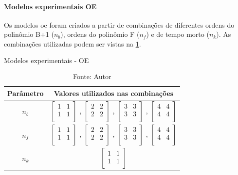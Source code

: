 \paragraph*{\textbf{Modelos experimentais OE}}
\label{par:modelos_experimentais_oe}

Os modelos \acrshort{oe} foram criados a partir de combinações de diferentes ordens do polinômio B+1 ($n_b$),
ordens do polinômio F ($n_f$) e de tempo morto ($n_k$). As combinações utilizadas podem ser vistas na
\cref{tab:tclabsp-models-oe}.

\begin{table}[h]
	\centering
	\caption{Modelos experimentais - OE}
	\label{tab:tclabsp-models-oe}
	\begin{tabular}{c|c} \toprule
		{Parâmetro}		&	{Valores utilizados nas combinações}									\\ \midrule
		$n_b$			&
							$ \begin{bmatrix}	1	&	1	\\	1	&	1	\\	\end{bmatrix} $	,		
							$ \begin{bmatrix}	2	&	2	\\	2	&	2	\\	\end{bmatrix} $	,		
							$ \begin{bmatrix}	3	&	3	\\	3	&	3	\\	\end{bmatrix} $	,		
							$ \begin{bmatrix}	4	&	4	\\	4	&	4	\\	\end{bmatrix} $		\\ \midrule
		$n_f$			&
							$ \begin{bmatrix}	1	&	1	\\	1	&	1	\\	\end{bmatrix} $	,		
							$ \begin{bmatrix}	2	&	2	\\	2	&	2	\\	\end{bmatrix} $	,		
							$ \begin{bmatrix}	3	&	3	\\	3	&	3	\\	\end{bmatrix} $	,		
							$ \begin{bmatrix}	4	&	4	\\	4	&	4	\\	\end{bmatrix} $		\\ \midrule
		$n_k$			&
							$ \begin{bmatrix}	1	&	1	\\	1	&	1	\\	\end{bmatrix} $		\\ \bottomrule
	\end{tabular}
	\caption*{Fonte: Autor}
\end{table}

